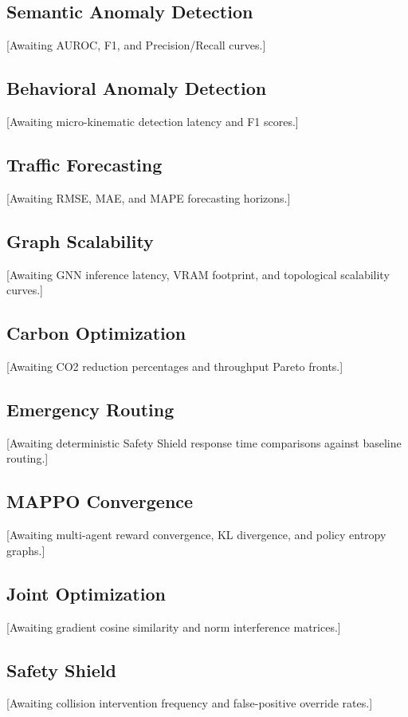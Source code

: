 \documentclass[journal]{IEEEtran}
\begin{document}
\subsection{Semantic Anomaly Detection}
[Awaiting AUROC, F1, and Precision/Recall curves.]

\subsection{Behavioral Anomaly Detection}
[Awaiting micro-kinematic detection latency and F1 scores.]

\subsection{Traffic Forecasting}
[Awaiting RMSE, MAE, and MAPE forecasting horizons.]

\subsection{Graph Scalability}
[Awaiting GNN inference latency, VRAM footprint, and topological scalability curves.]

\subsection{Carbon Optimization}
[Awaiting CO2 reduction percentages and throughput Pareto fronts.]

\subsection{Emergency Routing}
[Awaiting deterministic Safety Shield response time comparisons against baseline routing.]

\subsection{MAPPO Convergence}
[Awaiting multi-agent reward convergence, KL divergence, and policy entropy graphs.]

\subsection{Joint Optimization}
[Awaiting gradient cosine similarity and norm interference matrices.]

\subsection{Safety Shield}
[Awaiting collision intervention frequency and false-positive override rates.]
\end{document}
